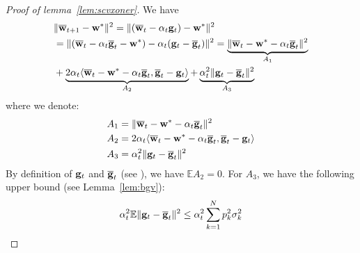 \begin{proof}[Proof of lemma~\ref{lem:scvxoner}]
	We have 
	\begin{align*}
	&\|{\overline{\mathbf{w}}}_{t+1}-{\mathbf{w}}^{\ast}\|^{2}  =\|({\overline{\mathbf{w}}}_{t}-\alpha_{t}{\mathbf{g}}_{t})-{\mathbf{w}}^{\ast}\|^{2}\\ &=\|({\overline{\mathbf{w}}}_{t}-\alpha_{t}{\overline{\mathbf{g}}}_{t}-{\mathbf{w}}^{\ast})-\alpha_{t}({\mathbf{g}}_{t}-{\overline{\mathbf{g}}}_{t})\|^{2} = \underbrace{\|{\overline{\mathbf{w}}}_{t}-{\mathbf{w}}^{\ast}-\alpha_{t}{\overline{\mathbf{g}}}_{t}\|^{2}}_{A_1} \\ &+\underbrace{2\alpha_{t}\langle{\overline{\mathbf{w}}}_{t}-{\mathbf{w}}^{\ast}-\alpha_{t}{\overline{\mathbf{g}}}_{t},{\overline{\mathbf{g}}}_{t}-{\mathbf{g}}_{t}\rangle}_{A_2} + \underbrace{\alpha_{t}^{2}\|{\mathbf{g}}_{t}-{\overline{\mathbf{g}}}_{t}\|^{2}}_{A_3}
	\end{align*}
	where we denote: 
	\begin{align*}
	A_{1} & =\|{\overline{\mathbf{w}}}_{t}-{\mathbf{w}}^{\ast}-\alpha_{t}{\overline{\mathbf{g}}}_{t}\|^{2}\\
	A_{2} & =2\alpha_{t}\langle{\overline{\mathbf{w}}}_{t}-{\mathbf{w}}^{\ast}-\alpha_{t}{\overline{\mathbf{g}}}_{t},{\overline{\mathbf{g}}}_{t}-{\mathbf{g}}_{t}\rangle\\
	A_{3} & =\alpha_{t}^{2}\|{\mathbf{g}}_{t}-{\overline{\mathbf{g}}}_{t}\|^{2}
	\end{align*}
	By definition of ${\mathbf{g}}_{t}$ and ${\overline{\mathbf{g}}}_{t}$ (see \eq{\ref{eq:gradient}}), we have $\mathbb{E}A_{2}=0$.
	For $A_{3}$, we have the following upper bound (see Lemma~\ref{lem:bgv}):
	\begin{align*}
	\alpha_{t}^{2}\mathbb{E}\|{\mathbf{g}}_{t}-{\overline{\mathbf{g}}}_{t}\|^{2} \leq\alpha_{t}^{2}\sum_{k=1}^{N}p_{k}^{2}\sigma_{k}^{2}
	\end{align*} 
	

\end{proof}
